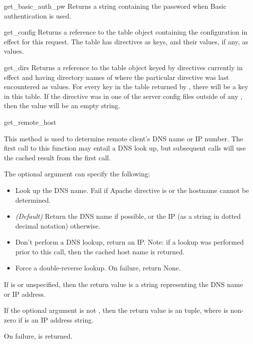 \begin{methoddesc}[Request]{get_basic_auth_pw}{}
Returns a string containing the password when Basic authentication is
used.
\end{methoddesc}

\begin{methoddesc}[Request]{get_config}{}
Returns a reference to the table object containing the configuration
in effect for this request. The table has directives as keys, and
their values, if any, as values.
\end{methoddesc}

\begin{methoddesc}[Request]{get_dirs}{}
Returns a reference to the table object keyed by directives currently
in effect and having directory names of where the particular directive
was last encountered as values. For every key in the table returned by
, there will be a key in this table. If the directive was
in one of the server config files outside of any ,
then the value will be an empty string.
\end{methoddesc}

\begin{methoddesc}[Request]{get_remote_host}{}

This method is used to determine remote client's DNS name or IP
number. The first call to this function may entail a DNS look up, but
subsequent calls will use the cached result from the first call.

The optional  argument can specify the following: 

\begin{itemize}

\item
{} Look up the DNS name. Fail if Apache 
directive  is  or the hostname cannot
be determined.

\item                  
{} \emph{(Default)} Return the DNS name if
possible, or the IP (as a string in dotted decimal notation)
otherwise.

\item
{} Don't perform a DNS lookup, return an
IP. Note: if a lookup was performed prior to this call, then the
cached host name is returned.

\item
{} Force a double-reverse lookup. On 
failure, return None.

\end{itemize}

If  is  or unspecified, then the return
value is a string representing the DNS name or IP address.

If the optional  argument is not , then the
return value is an  tuple, where 
is non-zero if  is an IP address string.

On failure,  is returned.

\end{methoddesc}

